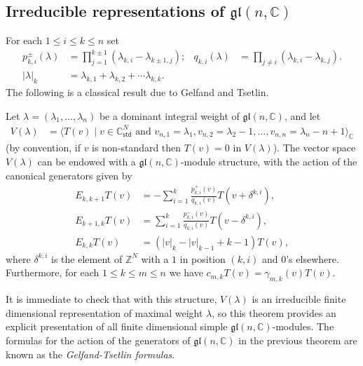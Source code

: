\documentclass[11pt,fleqn]{article}
\newcommand\CC{\mathbb C}
\newcommand\ZZ{\mathbb Z}
\newcommand\gl{\mathfrak{gl}}
\newcommand\std{\mathsf{std}}
\begin{document}
\subsection{Irreducible representations of $\gl(n,\CC)$}
For each $1 \leq i \leq k \leq n$ set
\begin{align*}
p_{k,i}^\pm(\lambda) 
	&= \prod_{j = 1}^{k\pm1}(\lambda_{k,i} -\lambda_{k\pm1,j}); &
q_{k,i}(\lambda)
	&= \prod_{j \neq i} (\lambda_{k,i} - \lambda_{k,j}). \\
|\lambda|_k &= \lambda_{k,1} + \lambda_{k,2} + \cdots \lambda_{k,k}.
\end{align*}
The following is a classical result due to Gelfand and Tsetlin. 
\begin{Theorem}
\label{GT}
Let $\lambda = (\lambda_1, \ldots, \lambda_n)$ be a dominant integral weight 
of $\gl(n,\CC)$, and let 
\begin{align*}
V(\lambda) 
	&= \langle T(v) \mid v \in \CC^N_{\std} 
		\mbox{ and } v_{n,1} = \lambda_1, v_{n,2} = \lambda_2 - 1, \ldots, 
		v_{n,n} = \lambda_{n} - n +1
	\rangle_\CC
\end{align*}
(by convention, if $v$ is non-standard then $T(v) = 0$ in $V(\lambda)$).
The vector space $V(\lambda)$ can be endowed with a $\gl(n,\CC)$-module 
structure, with the action of the canonical generators given by
\begin{align*}
E_{k,k+1} T(v) 
	&= - \sum_{i=1}^k \frac{p^+_{k,i}(v)}{q_{k,i}(v)} T(v + \delta^{k,i}), \\
E_{k+1,k} T(v) 
	&= \sum_{i=1}^k \frac{p^-_{k,i}(v)}{q_{k,i}(v)} T(v - \delta^{k,i}), \\
E_{k,k} T(v)
	&= (|v|_k - |v|_{k-1} + k -1) T(v),
\end{align*}
where $\delta^{k,i}$ is the element of $\ZZ^N$ with a $1$ in position $(k,i)$
and $0$'s elsewhere. Furthermore, for each $1 \leq k \leq m \leq n$ we have 
$c_{m,k} T(v) = \gamma_{m,k}(v) T(v)$. 
\end{Theorem}
It is immediate to check that with this structure, $V(\lambda)$ is an 
irreducible finite dimensional representation of maximal weight $\lambda$, so 
this theorem provides an explicit presentation of all finite dimensional 
simple $\gl(n,\CC)$-modules. The formulas for the action of the generators of 
$\gl(n,\CC)$ in the previous theorem are known as the \emph{Gelfand-Tsetlin 
formulas}.
\end{document}
